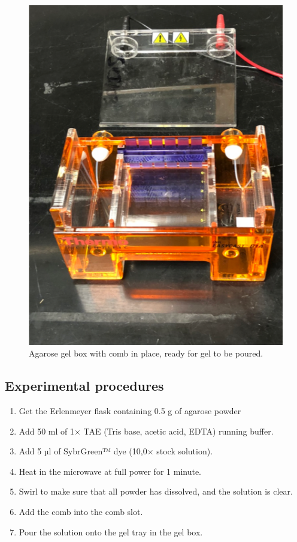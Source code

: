\begin{figure}

{\centering \includegraphics[width=0.7\linewidth]{./figures/molbio/Gel_box}

}

\caption{Agarose gel box with comb in place, ready for gel to be poured.}\label{fig:box}
\end{figure}

\subsection{Experimental procedures}\label{experimental-procedures-29}

\begin{enumerate}
\def\labelenumi{\arabic{enumi}.}
\setcounter{enumi}{1}
\tightlist
\item
  Get the Erlenmeyer flask containing 0.5 g of agarose powder
\item
  Add 50 ml of 1× TAE (Tris base, acetic acid, EDTA) running buffer.
\item
  Add 5 µl of SybrGreen™ dye (10,0× stock solution).
\item
  Heat in the microwave at full power for 1 minute.
\item
  Swirl to make sure that all powder has dissolved, and the solution is
  clear.
\item
  Add the comb into the comb slot.
\item
  Pour the solution onto the gel tray in the gel box.
\end{enumerate}


